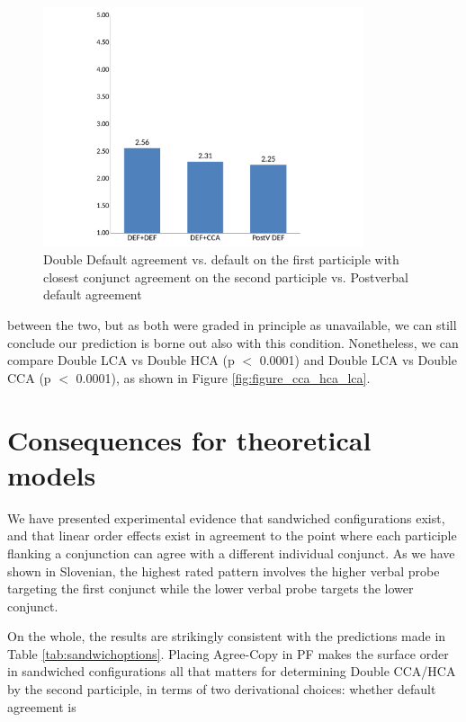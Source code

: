 \documentclass[output=paper
,modfonts
,nonflat]{langsci/langscibook}
\begin{document}
\begin{figure}[h]
	\begin{center}
		\includegraphics[height=200pt]{figures/defdef_defcca_postvdef_nl.pdf}
	\end{center}
	\caption{Double Default agreement vs. default on the first participle with closest conjunct agreement on the second participle vs. Postverbal default agreement}
	\label{fig:figure_defdef_defcca_postvdef}
\end{figure}
\noindent between the two, but as both were graded in principle as unavailable, we can still conclude our prediction is borne out also with this condition. Nonetheless, we can compare Double LCA vs Double HCA (p $<$ 0.0001) and Double LCA vs Double CCA (p $<$ 0.0001), as shown in Figure \ref{fig:figure_cca_hca_lca}. 



\section{Consequences for theoretical models}
We have presented experimental evidence that sandwiched configurations exist, and that linear order effects exist in agreement to the point where each participle flanking a conjunction can agree with a different individual conjunct. As we have shown in Slovenian, the highest rated pattern involves the higher verbal probe targeting the first conjunct while the lower verbal probe targets the lower conjunct. 

On the whole, the results are strikingly consistent with the predictions made in Table \ref{tab:sandwichoptions}. Placing Agree-Copy in PF makes the surface order in sandwiched configurations all that matters for determining Double CCA/HCA by the second participle, in terms of two derivational choices: whether default agreement is 
\end{document}
